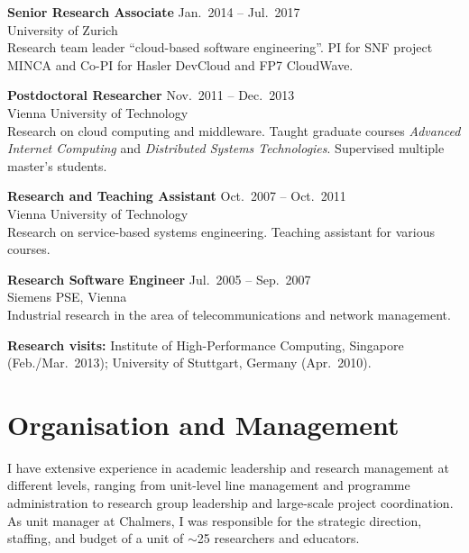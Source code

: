 \documentclass[a4paper,11pt]{article}
\begin{document}
\noindent\textbf{Senior Research Associate} \hfill Jan.\ 2014 -- Jul.\ 2017\\
University of Zurich\\
{\small Research team leader ``cloud-based software engineering''. PI for SNF project MINCA and Co-PI for Hasler DevCloud and FP7 CloudWave.}\medskip

\noindent\textbf{Postdoctoral Researcher} \hfill Nov.\ 2011 -- Dec.\ 2013\\
Vienna University of Technology\\
{\small Research on cloud computing and middleware. Taught graduate courses \emph{Advanced Internet Computing} and \emph{Distributed Systems Technologies}. Supervised multiple master's students.}\medskip

\noindent\textbf{Research and Teaching Assistant} \hfill Oct.\ 2007 -- Oct.\ 2011\\
Vienna University of Technology\\
{\small Research on service-based systems engineering. Teaching assistant for various courses.}\medskip

\noindent\textbf{Research Software Engineer} \hfill Jul.\ 2005 -- Sep.\ 2007\\
Siemens PSE, Vienna\\
{\small Industrial research in the area of telecommunications and network management.}\medskip

\noindent\textbf{Research visits:} Institute of High-Performance Computing, Singapore (Feb./Mar.\ 2013); University of Stuttgart, Germany (Apr.\ 2010).

\section{Organisation and Management}

I have extensive experience in academic leadership and research management at different levels, ranging from unit-level line management and programme administration to research group leadership and large-scale project coordination. As unit manager at Chalmers, I was responsible for the strategic direction, staffing, and budget of a unit of $\sim$25 researchers and educators.
\end{document}
